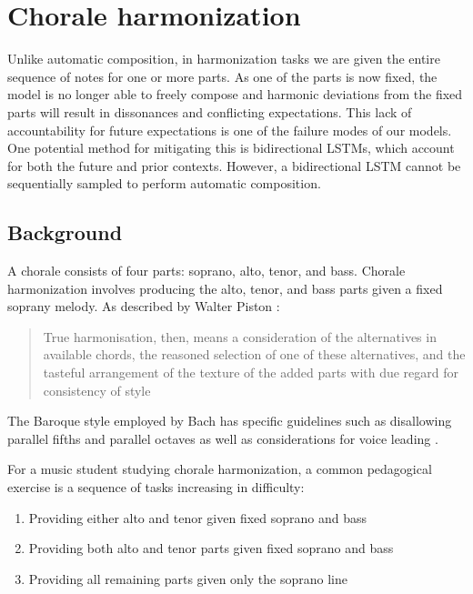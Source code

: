 \documentclass[dissertation.tex]{subfiles}
\begin{document}
\chapter{Chorale harmonization}



Unlike automatic composition, in harmonization tasks we are given the entire sequence of notes
for one or more parts. As one of the parts is now fixed, the model is no longer able to freely
compose and harmonic deviations from the fixed parts will result in dissonances and conflicting
expectations. This lack of accountability for future expectations is one of the failure modes of our models.
One potential method for mitigating this is bidirectional LSTMs\cite{Graves2005}, which account
for both the future and prior contexts. However, a bidirectional LSTM cannot be sequentially
sampled to perform automatic composition.

\section{Background}

A chorale consists of four parts: soprano, alto, tenor, and bass. Chorale harmonization
involves producing the alto, tenor, and bass parts given a fixed soprany melody. As described
by Walter Piston \cite{piston1978harmony}:

\begin{quote}
  True harmonisation, then, means a consideration of the alternatives in available chords, the reasoned selection of one
  of these alternatives, and the tasteful arrangement of the texture of the added parts with due regard
  for consistency of style
\end{quote}

The Baroque style employed by Bach has specific guidelines
such as disallowing parallel fifths and parallel octaves as well as
considerations for voice leading \cite{piston1978harmony}.

For a music student studying chorale harmonization, a common pedagogical
exercise \cite{denny1960oxford}\cite{piston1978harmony} is a sequence of tasks increasing in difficulty:
\begin{enumerate}
  \item Providing either alto and tenor given fixed soprano and bass
  \item Providing both alto and tenor parts given fixed soprano and bass
  \item Providing all remaining parts given only the soprano line
\end{enumerate}
\end{document}
